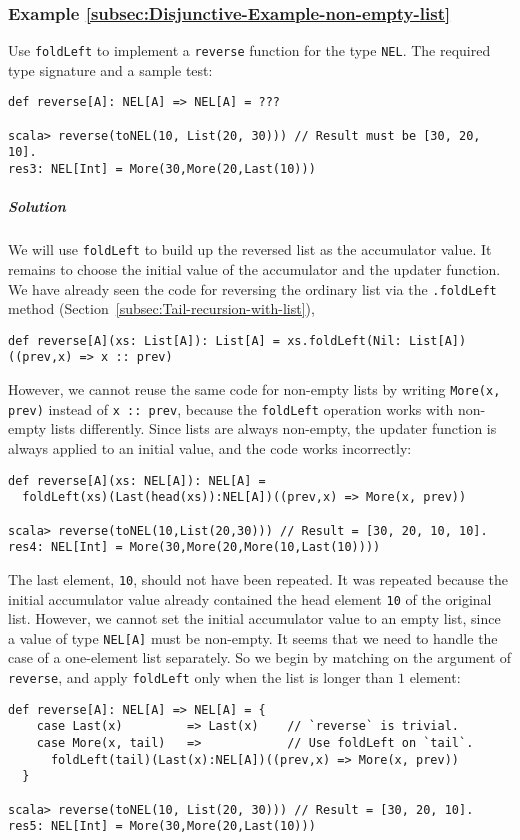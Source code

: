 \subsubsection{Example \label{subsec:Disjunctive-Example-non-empty-list}\ref{subsec:Disjunctive-Example-non-empty-list}}

Use \lstinline!foldLeft! to implement a \lstinline!reverse! function
for the type \lstinline!NEL!. The required type signature and a sample
test:
\begin{lstlisting}
def reverse[A]: NEL[A] => NEL[A] = ???

scala> reverse(toNEL(10, List(20, 30))) // Result must be [30, 20, 10].
res3: NEL[Int] = More(30,More(20,Last(10)))
\end{lstlisting}


\subparagraph{Solution}

We will use \lstinline!foldLeft! to build up the reversed list as
the accumulator value. It remains to choose the initial value of the
accumulator and the updater function. We have already seen the code
for reversing the ordinary list via the \lstinline!.foldLeft! method
(Section~\ref{subsec:Tail-recursion-with-list}),
\begin{lstlisting}
def reverse[A](xs: List[A]): List[A] = xs.foldLeft(Nil: List[A])((prev,x) => x :: prev)
\end{lstlisting}
However, we cannot reuse the same code for non-empty lists by writing
\lstinline!More(x, prev)! instead of \lstinline!x :: prev!, because
the \lstinline!foldLeft! operation works with non-empty lists differently.
Since lists are always non-empty, the updater function is always applied
to an initial value, and the code works incorrectly:
\begin{lstlisting}
def reverse[A](xs: NEL[A]): NEL[A] =
  foldLeft(xs)(Last(head(xs)):NEL[A])((prev,x) => More(x, prev))

scala> reverse(toNEL(10,List(20,30))) // Result = [30, 20, 10, 10].
res4: NEL[Int] = More(30,More(20,More(10,Last(10))))
\end{lstlisting}
The last element, \lstinline!10!, should not have been repeated.
It was repeated because the initial accumulator value already contained
the head element \lstinline!10! of the original list. However, we
cannot set the initial accumulator value to an empty list, since a
value of type \lstinline!NEL[A]! must be non-empty. It seems that
we need to handle the case of a one-element list separately. So we
begin by matching on the argument of \lstinline!reverse!, and apply
\lstinline!foldLeft! only when the list is longer than $1$ element:
\begin{lstlisting}
def reverse[A]: NEL[A] => NEL[A] = {
    case Last(x)         => Last(x)    // `reverse` is trivial.
    case More(x, tail)   =>            // Use foldLeft on `tail`.
      foldLeft(tail)(Last(x):NEL[A])((prev,x) => More(x, prev))
  }

scala> reverse(toNEL(10, List(20, 30))) // Result = [30, 20, 10].
res5: NEL[Int] = More(30,More(20,Last(10)))
\end{lstlisting}


